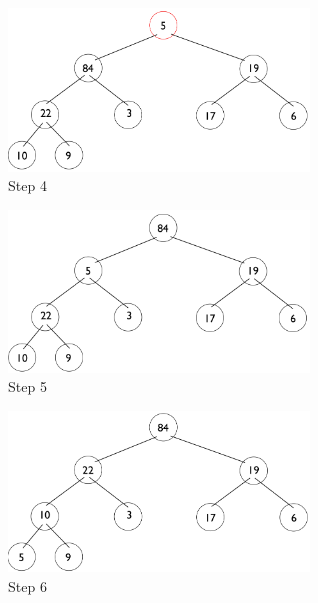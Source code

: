 \documentclass[11pt,letterpaper]{article}
\begin{document}
\begin{figure}[!h]

	\begin{center}
	\includegraphics[width=80mm]{images/6_3_1_4_tree.png}
	\end{center}

\caption{Step 4 }
\end{figure}

\pagebreak

\begin{figure}[!h]

	\begin{center}
	\includegraphics[width=80mm]{images/6_3_1_5_tree.png}
	\end{center}

\caption{Step 5 }
\end{figure}

\begin{figure}[!h]

	\begin{center}
	\includegraphics[width=80mm]{images/6_3_1_6_tree.png}
	\end{center}

\caption{Step 6 }
\end{figure}
\end{document}
